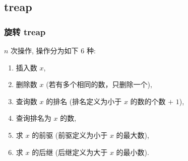 \documentclass[UTF8, a4paper, titlepage, twoside]{ctexart}
\begin{document}
\subsection{ treap }

\subsubsection*{ 旋转 treap }

$n$ 次操作, 操作分为如下 $6$ 种:
\begin{enumerate}
	\item 插入数 $x$,
	\item 删除数 $x$ (若有多个相同的数，只删除一个),
	\item 查询数 $x$ 的排名 (排名定义为小于 $x$ 的数的个数 $+$ $1$),
	\item 查询排名为 $x$ 的数,
	\item 求 $x$ 的前驱 (前驱定义为小于 $x$ 的最大数),
	\item 求 $x$ 的后继 (后继定义为大于 $x$ 的最小数).
\end{enumerate}
\end{document}
